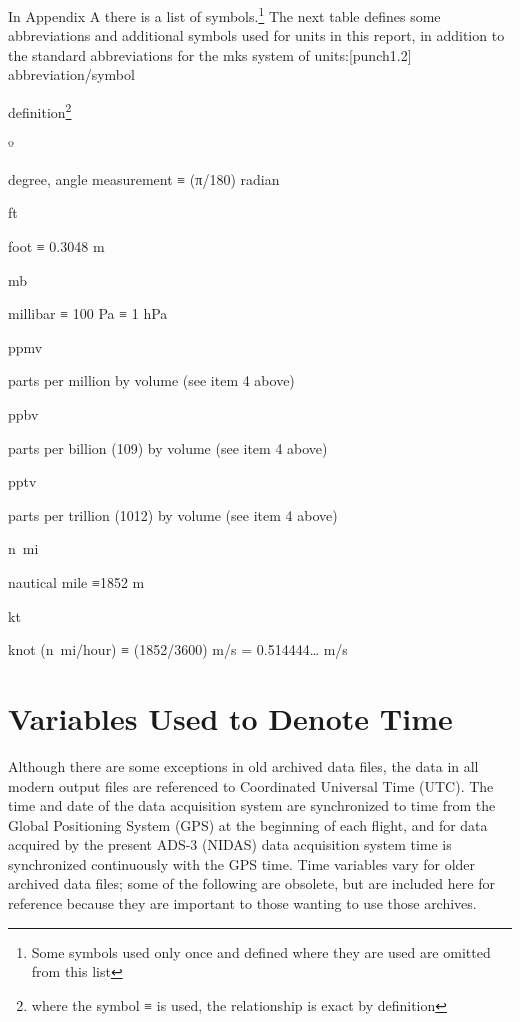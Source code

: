 \documentclass[
  english,
]{book}
\begin{document}
In Appendix A there is a list of symbols.\footnote{Some symbols used only once and defined where they are used are omitted from this list} The next table defines some abbreviations and additional symbols used for units in this report, in addition to the standard abbreviations for the mks system of units:\protect\hypertarget{punch1.2}{}{{[}punch1.2{]}}\\

abbreviation/symbol

definition\footnote{where the symbol {≡} is used, the relationship is exact by definition}

º

degree, angle measurement {≡} ({π}/180) radian

ft

foot {≡} 0.3048 m

mb

millibar {≡} 100 Pa {≡} 1 hPa

ppmv

parts per million by volume (see item 4 above)

ppbv

parts per billion ({109)} by volume (see item 4 above)

pptv

parts per trillion ({1012)} by volume (see item 4 above)

n~mi

nautical mile {≡}1852 m

kt

knot (n~mi/hour) {≡} (1852/3600) m/s = 0.514444\ldots{} m/s

\hypertarget{variables-used-to-denote-time}{%
\section{Variables Used to Denote Time}\label{variables-used-to-denote-time}}

Although there are some exceptions in old archived data files, the data in all modern output files are referenced to Coordinated Universal Time (UTC). The time and date of the data acquisition system are synchronized to time from the Global Positioning System (GPS) at the beginning of each flight, and for data acquired by the present ADS-3 (NIDAS) data acquisition system time is synchronized continuously with the GPS time. Time variables vary for older archived data files; some of the following are obsolete, but are included here for reference because they are important to those wanting to use those archives.
\end{document}
